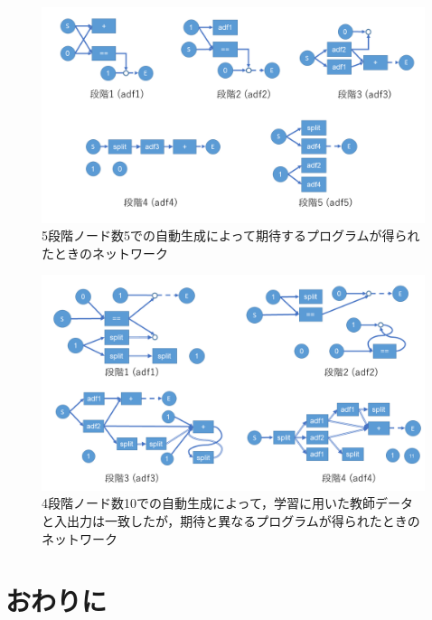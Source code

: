 \documentclass[exploratorypaper]{jsaiart} %
\begin{document}
\begin{figure}[t]
    \begin{center}
        \includegraphics[width=150mm]{out_net_p5n5.png}
    \end{center}
    \capwidth=130mm %
    \caption{5段階ノード数5での自動生成によって期待するプログラムが得られたときのネットワーク}
    \label{fig:out_net_p5n5}
\end{figure}

\begin{figure}[t]
    \begin{center}
        \includegraphics[width=150mm]{out_net_p4n10.png}
    \end{center}
    \capwidth=130mm %
    \caption{4段階ノード数10での自動生成によって，学習に用いた教師データと入出力は一致したが，期待と異なるプログラムが得られたときのネットワーク}
    \label{fig:out_net_p4n10}
\end{figure}

\section{おわりに}
\end{document}
